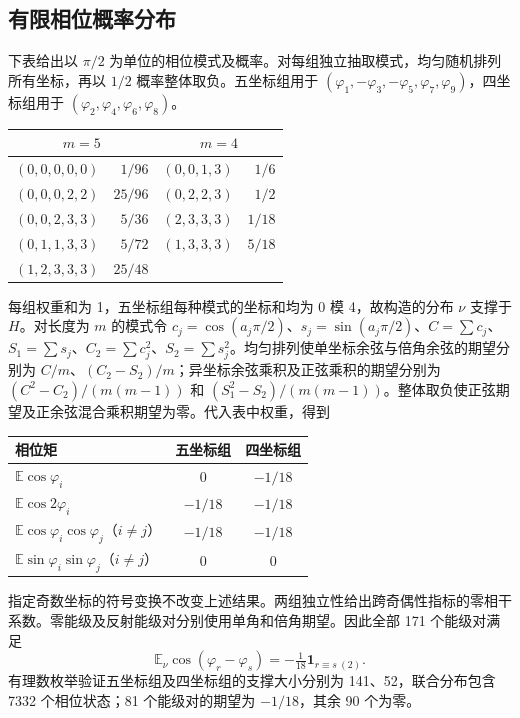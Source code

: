 \documentclass[11pt,a4paper]{article}
\begin{document}
\subsection{有限相位概率分布}
下表给出以 $\pi/2$ 为单位的相位模式及概率。对每组独立抽取模式，均匀随机排列所有坐标，再以 $1/2$ 概率整体取负。五坐标组用于 $(\varphi_1,-\varphi_3,-\varphi_5,\varphi_7,\varphi_9)$，四坐标组用于 $(\varphi_2,\varphi_4,\varphi_6,\varphi_8)$。
\begin{center}\begin{tabular}{@{}lr@{\qquad}lr@{}}\toprule
\multicolumn{2}{c}{\(m=5\)}&\multicolumn{2}{c}{\(m=4\)}\\\midrule
$(0,0,0,0,0)$&$1/96$&$(0,0,1,3)$&$1/6$\\
$(0,0,0,2,2)$&$25/96$&$(0,2,2,3)$&$1/2$\\
$(0,0,2,3,3)$&$5/36$&$(2,3,3,3)$&$1/18$\\
$(0,1,1,3,3)$&$5/72$&$(1,3,3,3)$&$5/18$\\
$(1,2,3,3,3)$&$25/48$&&\\\bottomrule
\end{tabular}\end{center}
每组权重和为 1，五坐标组每种模式的坐标和均为 0 模 4，故构造的分布 $\nu$ 支撑于 $H$。对长度为 $m$ 的模式令 $c_j=\cos(a_j\pi/2)$、$s_j=\sin(a_j\pi/2)$、$C=\sum c_j$、$S_1=\sum s_j$、$C_2=\sum c_j^2$、$S_2=\sum s_j^2$。均匀排列使单坐标余弦与倍角余弦的期望分别为 $C/m$、$(C_2-S_2)/m$；异坐标余弦乘积及正弦乘积的期望分别为 $(C^2-C_2)/(m(m-1))$ 和 $(S_1^2-S_2)/(m(m-1))$。整体取负使正弦期望及正余弦混合乘积期望为零。代入表中权重，得到
\begin{center}\begin{tabular}{lcc}\toprule
相位矩 & 五坐标组 & 四坐标组\\\midrule
$\mathbb E\cos\varphi_i$ & $0$ & $-1/18$\\
$\mathbb E\cos 2\varphi_i$ & $-1/18$ & $-1/18$\\
$\mathbb E\cos\varphi_i\cos\varphi_j$（$i\ne j$）&$-1/18$&$-1/18$\\
$\mathbb E\sin\varphi_i\sin\varphi_j$（$i\ne j$）&$0$&$0$\\\bottomrule
\end{tabular}\end{center}
指定奇数坐标的符号变换不改变上述结果。两组独立性给出跨奇偶性指标的零相干系数。零能级及反射能级对分别使用单角和倍角期望。因此全部 171 个能级对满足
\[
\mathbb E_\nu\cos(\varphi_r-\varphi_s)=-\tfrac1{18}\mathbf1_{r\equiv s\ (2)}.
\]
有理数枚举验证五坐标组及四坐标组的支撑大小分别为 141、52，联合分布包含 7332 个相位状态；81 个能级对的期望为 $-1/18$，其余 90 个为零。
\end{document}
